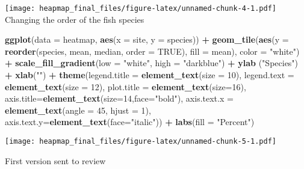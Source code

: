 \documentclass[]{article}
\newenvironment{Shaded}{\begin{snugshade}}{\end{snugshade}}
\newcommand{\KeywordTok}[1]{\textcolor[rgb]{0.13,0.29,0.53}{\textbf{#1}}}
\newcommand{\DataTypeTok}[1]{\textcolor[rgb]{0.13,0.29,0.53}{#1}}
\newcommand{\DecValTok}[1]{\textcolor[rgb]{0.00,0.00,0.81}{#1}}
\newcommand{\StringTok}[1]{\textcolor[rgb]{0.31,0.60,0.02}{#1}}
\newcommand{\OtherTok}[1]{\textcolor[rgb]{0.56,0.35,0.01}{#1}}
\newcommand{\OperatorTok}[1]{\textcolor[rgb]{0.81,0.36,0.00}{\textbf{#1}}}
\newcommand{\NormalTok}[1]{#1}
\begin{document}
\texttt{[image: heapmap\_final\_files/figure-latex/unnamed-chunk-4-1.pdf]}
Changing the order of the fish species

\begin{Shaded}
\begin{Highlighting}[]
\KeywordTok{ggplot}\NormalTok{(}\DataTypeTok{data =}\NormalTok{ heatmap, }\KeywordTok{aes}\NormalTok{(}\DataTypeTok{x =}\NormalTok{ site, }\DataTypeTok{y =}\NormalTok{ species)) }\OperatorTok{+}\StringTok{ }\KeywordTok{geom_tile}\NormalTok{(}\KeywordTok{aes}\NormalTok{(}\DataTypeTok{y =} \KeywordTok{reorder}\NormalTok{(species, mean, median, }\DataTypeTok{order =} \OtherTok{TRUE}\NormalTok{), }\DataTypeTok{fill =}\NormalTok{ mean), }\DataTypeTok{color =} \StringTok{"white"}\NormalTok{) }\OperatorTok{+}
\StringTok{  }\KeywordTok{scale_fill_gradient}\NormalTok{(}\DataTypeTok{low =} \StringTok{"white"}\NormalTok{, }\DataTypeTok{high =} \StringTok{"darkblue"}\NormalTok{) }\OperatorTok{+}
\StringTok{  }\KeywordTok{ylab}\NormalTok{ (}\StringTok{"Species"}\NormalTok{) }\OperatorTok{+}
\StringTok{  }\KeywordTok{xlab}\NormalTok{(}\StringTok{""}\NormalTok{) }\OperatorTok{+}\StringTok{  }
\StringTok{  }\KeywordTok{theme}\NormalTok{(}\DataTypeTok{legend.title =} \KeywordTok{element_text}\NormalTok{(}\DataTypeTok{size =} \DecValTok{10}\NormalTok{),}
        \DataTypeTok{legend.text =} \KeywordTok{element_text}\NormalTok{(}\DataTypeTok{size =} \DecValTok{12}\NormalTok{),}
        \DataTypeTok{plot.title =} \KeywordTok{element_text}\NormalTok{(}\DataTypeTok{size=}\DecValTok{16}\NormalTok{),}
        \DataTypeTok{axis.title=}\KeywordTok{element_text}\NormalTok{(}\DataTypeTok{size=}\DecValTok{14}\NormalTok{,}\DataTypeTok{face=}\StringTok{"bold"}\NormalTok{),}
        \DataTypeTok{axis.text.x =} \KeywordTok{element_text}\NormalTok{(}\DataTypeTok{angle =} \DecValTok{45}\NormalTok{, }\DataTypeTok{hjust =} \DecValTok{1}\NormalTok{),}
\DataTypeTok{axis.text.y=}\KeywordTok{element_text}\NormalTok{(}\DataTypeTok{face=}\StringTok{"italic"}\NormalTok{)) }\OperatorTok{+}
\StringTok{  }\KeywordTok{labs}\NormalTok{(}\DataTypeTok{fill =} \StringTok{"Percent"}\NormalTok{)}
\end{Highlighting}
\end{Shaded}

\texttt{[image: heapmap\_final\_files/figure-latex/unnamed-chunk-5-1.pdf]}

First version sent to review
\end{document}
